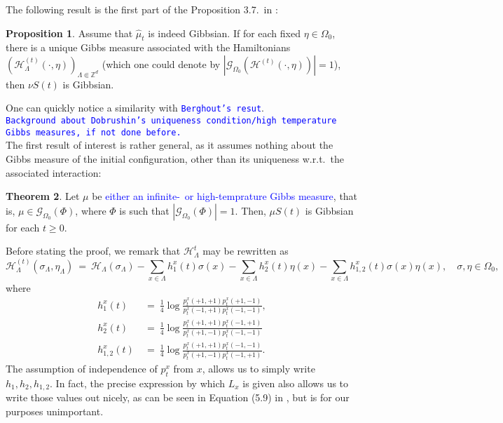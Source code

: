 \documentclass[12pt]{article}
\newcommand{\G}{\mathcal{G}}
\renewcommand{\H}{\mathcal{H}}
\newcommand{\Z}{\mathbb{Z}}
\newcommand{\pika}{\boldsymbol{\cdot}}
\newcommand{\1}{\mathbbm{1}}
\newcommand{\5}{\vspace{0.5cm}}
\renewcommand{\hat}{\widehat}
\theoremstyle{definition}
\newtheorem{thm}{Theorem}[section]
\newtheorem{prop}[thm]{Proposition}
\begin{document}
The following result is the first part of the Proposition 3.7.~in \cite{EFHR}:
\begin{prop}
Assume that $\hat{\mu}_t$ is indeed Gibbsian. If for each fixed $\eta\in\Omega_0$, there is a unique Gibbs measure associated with the Hamiltonians $(\H_\Lambda^{(t)}(\pika,\eta))_{\Lambda\Subset\Z^d}$ (which one could denote by $|\G_{\Omega_0}(\H^{(t)}(\pika,\eta))|=1$), then $\nu S(t)$ is Gibbsian.
\end{prop}
One can quickly notice a similarity with \textcolor{blue}{\texttt{Berghout's resut}}. \\

\textcolor{blue}{\texttt{Background about Dobrushin's uniqueness condition/high temperature Gibbs measures, if not done before.}}\\

The first result of interest is rather general, as it assumes nothing about the Gibbs measure of the initial configuration, other than its uniqueness w.r.t.~the associated interaction:

\begin{thm}
Let $\mu$ be \textcolor{blue}{either an infinite-~or high-temprature Gibbs measure}, that is, $\mu\in\G_{\Omega_0}(\Phi)$, where $\Phi$ is such that $|\G_{\Omega_0}(\Phi)|=1$. Then, $\mu S(t)$ is Gibbsian for each $t\geq 0$.
\end{thm}

Before stating the proof, we remark that $\H_\Lambda^t$ may be rewritten as
$$\H_\Lambda^{(t)}(\sigma_\Lambda,\eta_\Lambda) ~=~ \H_\Lambda(\sigma_\Lambda) - \sum_{x\in\Lambda}h_1^x(t)\sigma(x) - \sum_{x\in\Lambda}h_2^x(t)\eta(x) - \sum_{x\in\Lambda}h_{1,2}^x(t)\sigma(x)\eta(x), \quad \sigma,\eta\in\Omega_0,$$
where 
\begin{align*}
h_1^x(t) ~&=~ \frac{1}{4}\log\frac{p_t^x(+1,+1)p_t^x(+1,-1)}{p_t^x(-1,+1)p_t^x(-1,-1)}, \\
h_2^x(t) ~&=~ \frac{1}{4}\log\frac{p_t^x(+1,+1)p_t^x(-1,+1)}{p_t^x(+1,-1)p_t^x(-1,-1)} \\
h_{1,2}^x(t) ~&=~ \frac{1}{4}\log\frac{p_t^{x}(+1,+1)p_t^x(-1,-1)}{p_t^x{(+1,-1)}p_t^{x}(-1,+1)}.
\end{align*}
The assumption of independence of $p_t^x$ from $x$, allows us to simply write $h_1,h_2,h_{1,2}$. In fact, the precise expression by which $L_x$ is given also allows us to write those values out nicely, as can be seen in Equation (5.9) in \cite{EFHR}, but is for our purposes unimportant.
\end{document}
